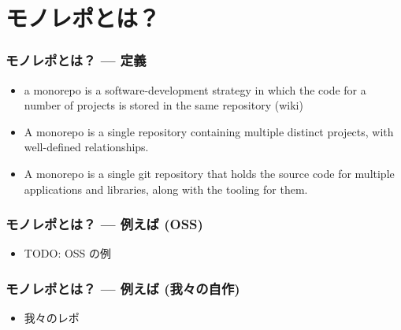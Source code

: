 \section{モノレポとは？}
\begin{frame}
\frametitle{モノレポとは？ --- 定義}
\begin{itemize}
    \item<2-> a monorepo is a software-development strategy in which the code for a number of projects is stored in the same repository (wiki)
    \item<3-> A monorepo is a single repository containing multiple distinct projects, with well-defined relationships.
    \item<4-> A monorepo is a single git repository that holds the source code for multiple applications and libraries, along with the tooling for them.
\end{itemize}
\end{frame}

\begin{frame}
\frametitle{モノレポとは？ --- 例えば (OSS)}
\begin{itemize}
    \item TODO: OSS の例
\end{itemize}
\end{frame}

\begin{frame}
    \frametitle{モノレポとは？ --- 例えば (我々の自作)}
    \begin{itemize}
        \item 我々のレポ
    \end{itemize}
\end{frame}
